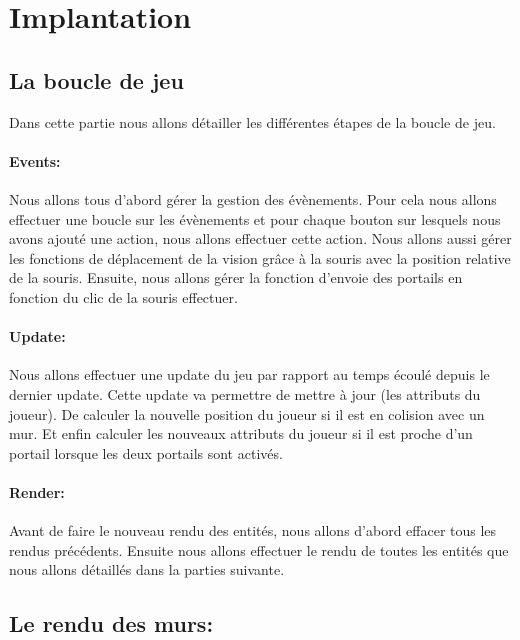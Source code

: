 \documentclass[11pt]{article}
\begin{document}
\section{Implantation}

\subsection{La boucle de jeu}
Dans cette partie nous allons détailler les différentes étapes de la boucle de jeu.

\paragraph{Events:}
Nous allons tous d'abord gérer la gestion des évènements. Pour cela nous allons effectuer une boucle sur les évènements et pour chaque bouton sur lesquels nous avons ajouté une action, nous allons effectuer cette action. Nous allons aussi gérer les fonctions de déplacement de la vision grâce à la souris avec la position relative de la souris. Ensuite, nous allons gérer la fonction d'envoie des portails en fonction du clic de la souris effectuer.

\paragraph{Update:}
Nous allons effectuer une update du jeu par rapport au temps écoulé depuis le dernier update. Cette update va permettre de mettre à jour (les attributs du joueur). De calculer la nouvelle position du joueur si il est en colision avec un mur. Et enfin calculer les nouveaux attributs du joueur si il est proche d'un portail lorsque les deux portails sont activés.

\paragraph{Render:}
Avant de faire le nouveau rendu des entités, nous allons d'abord effacer tous les rendus précédents. Ensuite nous allons effectuer le rendu de toutes les entités que nous allons détaillés dans la parties suivante.



\subsection{Le rendu des murs:}
\end{document}
